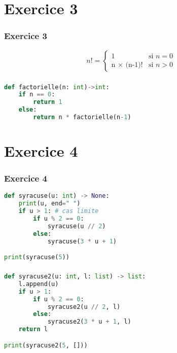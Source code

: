 \documentclass[svgnames,11pt]{beamer}
\begin{document}
\section{Exercice 3}
\begin{frame}
    \frametitle{Exercice 3}
    $$
    n! = \left\{
        \begin{array}{ll}
            1 & \mbox{si  }n=0\\
            \mbox{n × (n-1)!} & \mbox{si }n>0\
        \end{array}
    \right.
    $$
    

\end{frame}
\begin{frame}[fragile]
    \frametitle{}

\begin{center}
\begin{lstlisting}[language=Python , basicstyle=\ttfamily\small, xleftmargin=1em, xrightmargin=1em]
def factorielle(n: int)->int:
    if n == 0:
        return 1
    else:
        return n * factorielle(n-1)
\end{lstlisting}
\end{center}

\end{frame}
\section{Exercice 4}
\begin{frame}[fragile]
    \frametitle{Exercice 4}

\begin{center}
\begin{lstlisting}[language=Python , basicstyle=\ttfamily\small, xleftmargin=2em, xrightmargin=2em]
def syracuse(u: int) -> None:
    print(u, end=" ")
    if u > 1: # cas limite
        if u % 2 == 0:
            syracuse(u // 2)
        else:
            syracuse(3 * u + 1)

print(syracuse(5))
\end{lstlisting}
\end{center}

\end{frame}
\begin{frame}[fragile]
    \frametitle{}

\begin{center}
\begin{lstlisting}[language=Python , basicstyle=\ttfamily\small, xleftmargin=2em, xrightmargin=2em]
def syracuse2(u: int, l: list) -> list:
    l.append(u)
    if u > 1:
        if u % 2 == 0:
            syracuse2(u // 2, l)
        else:
            syracuse2(3 * u + 1, l)
    return l

print(syracuse2(5, []))
\end{lstlisting}
\label{CODE}
\end{center}
\end{frame}
\end{document}
